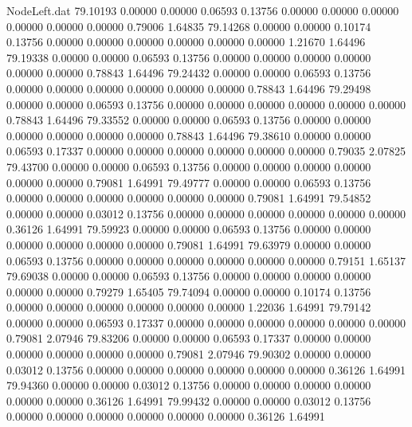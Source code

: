 \begin{filecontents}{NodeLeft.dat}
  79.10193    0.00000    0.00000     0.06593    0.13756    0.00000    0.00000    0.00000    0.00000    0.00000    0.00000    0.79006    1.64835
  79.14268    0.00000    0.00000     0.10174    0.13756    0.00000    0.00000    0.00000    0.00000    0.00000    0.00000    1.21670    1.64496
  79.19338    0.00000    0.00000     0.06593    0.13756    0.00000    0.00000    0.00000    0.00000    0.00000    0.00000    0.78843    1.64496
  79.24432    0.00000    0.00000     0.06593    0.13756    0.00000    0.00000    0.00000    0.00000    0.00000    0.00000    0.78843    1.64496
  79.29498    0.00000    0.00000     0.06593    0.13756    0.00000    0.00000    0.00000    0.00000    0.00000    0.00000    0.78843    1.64496
  79.33552    0.00000    0.00000     0.06593    0.13756    0.00000    0.00000    0.00000    0.00000    0.00000    0.00000    0.78843    1.64496
  79.38610    0.00000    0.00000     0.06593    0.17337    0.00000    0.00000    0.00000    0.00000    0.00000    0.00000    0.79035    2.07825
  79.43700    0.00000    0.00000     0.06593    0.13756    0.00000    0.00000    0.00000    0.00000    0.00000    0.00000    0.79081    1.64991
  79.49777    0.00000    0.00000     0.06593    0.13756    0.00000    0.00000    0.00000    0.00000    0.00000    0.00000    0.79081    1.64991
  79.54852    0.00000    0.00000     0.03012    0.13756    0.00000    0.00000    0.00000    0.00000    0.00000    0.00000    0.36126    1.64991
  79.59923    0.00000    0.00000     0.06593    0.13756    0.00000    0.00000    0.00000    0.00000    0.00000    0.00000    0.79081    1.64991
  79.63979    0.00000    0.00000     0.06593    0.13756    0.00000    0.00000    0.00000    0.00000    0.00000    0.00000    0.79151    1.65137
  79.69038    0.00000    0.00000     0.06593    0.13756    0.00000    0.00000    0.00000    0.00000    0.00000    0.00000    0.79279    1.65405
  79.74094    0.00000    0.00000     0.10174    0.13756    0.00000    0.00000    0.00000    0.00000    0.00000    0.00000    1.22036    1.64991
  79.79142    0.00000    0.00000     0.06593    0.17337    0.00000    0.00000    0.00000    0.00000    0.00000    0.00000    0.79081    2.07946
  79.83206    0.00000    0.00000     0.06593    0.17337    0.00000    0.00000    0.00000    0.00000    0.00000    0.00000    0.79081    2.07946
  79.90302    0.00000    0.00000     0.03012    0.13756    0.00000    0.00000    0.00000    0.00000    0.00000    0.00000    0.36126    1.64991
  79.94360    0.00000    0.00000     0.03012    0.13756    0.00000    0.00000    0.00000    0.00000    0.00000    0.00000    0.36126    1.64991
  79.99432    0.00000    0.00000     0.03012    0.13756    0.00000    0.00000    0.00000    0.00000    0.00000    0.00000    0.36126    1.64991

\end{filecontents}
